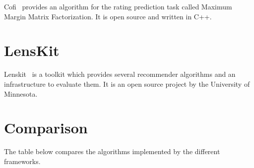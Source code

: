 Cofi~\cite{cofi} provides an algorithm for the rating prediction
task called Maximum Margin Matrix Factorization. It is open source
and written in C++.


\section{LensKit}

Lenskit~\cite{Ekstrand:2011:RRR:2043932.2043958} is a toolkit which provides several recommender
algorithms and an infrastructure to evaluate them. It is an open source
project by the University of Minnesota.


\section{Comparison}
The table below compares the algorithms implemented by the different
frameworks.

